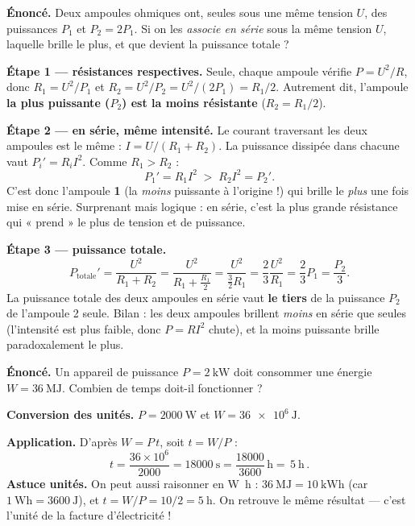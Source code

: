 \documentclass[11pt,a4paper]{article}
\begin{document}
\begin{exemple}
\textbf{Énoncé.} Deux ampoules ohmiques ont, seules sous une même tension $U$, des puissances
$P_1$ et $P_2=2P_1$. Si on les \emph{associe en série} sous la même tension $U$, laquelle brille le
plus, et que devient la puissance totale ?

\smallskip
\textbf{Étape 1 — résistances respectives.} Seule, chaque ampoule vérifie $P=U^2/R$, donc
$R_1=U^2/P_1$ et $R_2=U^2/P_2=U^2/(2P_1)=R_1/2$. Autrement dit, l'ampoule \textbf{la plus puissante
($P_2$) est la moins résistante} ($R_2=R_1/2$).

\textbf{Étape 2 — en série, même intensité.} Le courant traversant les deux ampoules est le même :
$I=U/(R_1+R_2)$. La puissance dissipée dans chacune vaut $P_i'=R_i I^2$. Comme $R_1>R_2$ :
\[ P_1' = R_1 I^{2} \;>\; R_2 I^{2} = P_2'. \]
C'est donc l'ampoule \textbf{1} (la \emph{moins} puissante à l'origine !) qui brille le \emph{plus}
une fois mise en série. Surprenant mais logique : en série, c'est la plus grande résistance qui
« prend » le plus de tension et de puissance.

\textbf{Étape 3 — puissance totale.}
\[ P_{\text{totale}}' = \frac{U^{2}}{R_1+R_2} = \frac{U^{2}}{R_1+\tfrac{R_1}{2}} = \frac{U^{2}}{\tfrac{3}{2}R_1}
   = \frac{2}{3}\frac{U^{2}}{R_1} = \frac{2}{3}P_1 = \frac{P_2}{3}. \]
La puissance totale des deux ampoules en série vaut \textbf{le tiers} de la puissance $P_2$ de
l'ampoule 2 seule. Bilan : les deux ampoules brillent \emph{moins} en série que seules (l'intensité
est plus faible, donc $P=RI^2$ chute), et la moins puissante brille paradoxalement le plus.
\end{exemple}

\begin{exemple}
\textbf{Énoncé.} Un appareil de puissance $P=\SI{2}{\kilo\watt}$ doit consommer une énergie
$W=\SI{36}{\mega\joule}$. Combien de temps doit-il fonctionner ?

\smallskip
\textbf{Conversion des unités.} $P=\SI{2000}{\watt}$ et $W=\SI{36e6}{\joule}$.

\textbf{Application.} D'après $W=P\,t$, soit $t=W/P$ :
\[ t = \frac{36\times10^{6}}{2000} = \SI{18000}{\second} = \frac{18000}{3600}\,\si{\hour}
   = \boxed{\,\SI{5}{\hour}\,}. \]
\textbf{Astuce unités.} On peut aussi raisonner en \si{\watt\hour} : $\SI{36}{\mega\joule} =
\SI{10}{\kilo\watt\hour}$ (car $\SI{1}{\watt\hour}=\SI{3600}{\joule}$), et $t=W/P=10/2=\SI{5}{\hour}$.
On retrouve le même résultat — c'est l'unité de la facture d'électricité !
\end{exemple}
\end{document}
